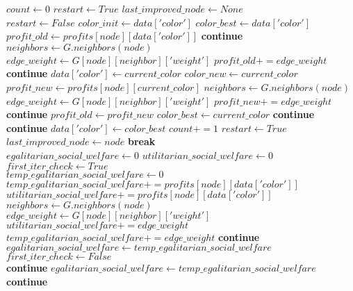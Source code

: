 \begin{algorithmic}

\State $count\gets 0$
\State $restart\gets True$
\State $last\_improved\_node\gets None$\\

	\State $restart\gets False$
		\State $color\_init\gets data['color']$
		\State $color\_best\gets data['color']$
		\State $profit\_old\gets profits[node][data['color']]$
			\State \textbf{continue}
		\EndIf
		\State $neighbors\gets G.neighbors(node)$
				\State $edge\_weight\gets G[node][neighbor]['weight']$
				\State $profit\_old += edge\_weight$
			\Else
				\State \textbf{continue}
			\EndIf
		\EndFor
				\State $data['color']\gets current\_color$
				\State $color\_new\gets current\_color$
				\State $profit\_new\gets profits[node][current\_color]$
				\State $neighbors\gets G.neighbors(node)$
						\State $edge\_weight\gets G[node][neighbor]['weight']$
						\State $profit\_new += edge\_weight$
					\Else
						\State \textbf{continue}
					\EndIf
						\State $profit\_old\gets profit\_new$
						\State $color\_best\gets current\_color$
					\Else
						\State \textbf{continue}
					\EndIf
				\EndFor
			\Else
				\State \textbf{continue}
			\EndIf
		\EndFor
		\State $data['color']\gets color\_best$
			\State $count += 1$
			\State $restart\gets True$
			\State $last\_improved\_node\gets node$
			\State \textbf{break}
		\EndIf
	\EndFor
\EndWhile \\

\State $egalitarian\_social\_welfare\gets 0$
\State $utilitarian\_social\_welfare\gets 0$
\State $first\_iter\_check\gets True$ \\

	\State $temp\_egalitarian\_social\_welfare\gets 0$
	\State $temp\_egalitarian\_social\_welfare += profits[node][data['color']]$
	\State $utilitarian\_social\_welfare += profits[node][data['color']]$
	\State $neighbors\gets G.neighbors(node)$
			\State $edge\_weight\gets G[node][neighbor]['weight']$
			\State $utilitarian\_social\_welfare += edge\_weight$
			\State $temp\_egalitarian\_social\_welfare += edge\_weight$
		\Else
			\State \textbf{continue}
		\EndIf
			\State $egalitarian\_social\_welfare\gets temp\_egalitarian\_social\_welfare$
			\State $first\_iter\_check\gets False$ \\
			\State \textbf{continue}
		\EndIf
			\State $egalitarian\_social\_welfare\gets temp\_egalitarian\_social\_welfare$
		\Else
			\State \textbf{continue}
		\EndIf
	\EndFor
\EndFor \\


\end{algorithmic}
